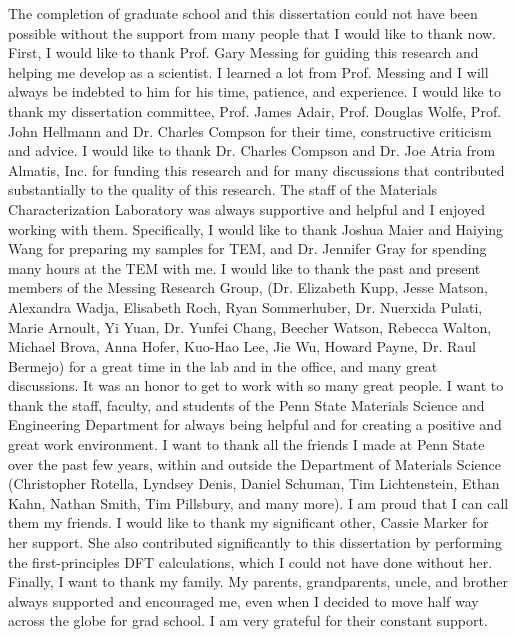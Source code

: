 The completion of graduate school and this dissertation could not have been possible without the support from many people that I would like to thank now.  
First, I would like to thank Prof. Gary Messing for guiding this research and helping me develop as a scientist. I learned a lot from Prof. Messing and I will always be indebted to him for his time, patience, and experience. 
I would like to thank my dissertation committee, Prof. James Adair, Prof. Douglas Wolfe, Prof. John Hellmann and Dr. Charles Compson for their time, constructive criticism and advice. 
I would like to thank Dr. Charles Compson and Dr. Joe Atria from Almatis, Inc. for funding this research and for many discussions that contributed substantially to the quality of this research. 
The staff of the Materials Characterization Laboratory was always supportive and helpful and I enjoyed working with them. Specifically, I would like to thank Joshua Maier and Haiying Wang for preparing my samples for TEM, and Dr. Jennifer Gray for spending many hours at the TEM with me.
I would like to thank the past and present members of the Messing Research Group, (Dr. Elizabeth Kupp, Jesse Matson, Alexandra Wadja, Elisabeth Roch, Ryan Sommerhuber, Dr. Nuerxida Pulati, Marie Arnoult, Yi Yuan, Dr. Yunfei Chang, Beecher Watson, Rebecca Walton, Michael Brova, Anna Hofer, Kuo-Hao Lee, Jie Wu, Howard Payne, Dr. Raul Bermejo) for a great time in the lab and in the office, and many great discussions. It was an honor to get to work with so many great people.
I want to thank the staff, faculty, and students of the Penn State Materials Science and Engineering Department for always being helpful and for creating a positive and great work environment.
I want to thank all the friends I made at Penn State over the past few years, within and outside the Department of Materials Science (Christopher Rotella, Lyndsey Denis, Daniel Schuman, Tim Lichtenstein, Ethan Kahn, Nathan Smith, Tim Pillsbury, and many more). I am proud that I can call them my friends.
I would like to thank my significant other, Cassie Marker for her support. She also contributed significantly to this dissertation by performing the first-principles DFT calculations, which I could not have done without her.
Finally, I want to thank my family. My parents, grandparents, uncle, and brother always supported and encouraged me, even when I decided to move half way across the globe for grad school. I am very grateful for their constant support.
